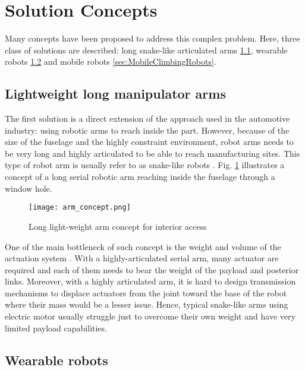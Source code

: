\section{Solution Concepts}

Many concepts have been proposed to address this complex problem. Here, three class of solutions are described: long snake-like articulated arms \ref{sec:LightWeightLongManipulatorArm}, wearable robots \ref{sec:WearableRobots} and mobile robots \ref{sec:MobileClimbingRobots}.

\subsection{Lightweight long manipulator arms}
\label{sec:LightWeightLongManipulatorArm}

The first solution is a direct extension of the approach used in the automotive industry: using robotic arms to reach inside the part. However, because of the size of the fuselage and the highly constraint environment, robot arms needs to be very long and highly articulated to be able to reach manufacturing sites. This type of robot arm is usually refer to as snake-like robots \cite{buckingham_snake-arm_2007}. Fig. \ref{fig:arm_concept} illustrates a concept of a long serial robotic arm reaching inside the fuselage through a window hole.

\begin{figure}[H]
	\centering
		\texttt{[image: arm\_concept.png]}
		\caption{Long light-weight arm concept for interior access}
	\label{fig:arm_concept}
\end{figure}

One of the main bottleneck of such concept is the weight and volume of the actuation system \cite{roy_nonlinear_2009}. With a highly-articulated serial arm, many actuator are required and each of them needs to bear the weight of the payload and posterior links. Moreover, with a highly articulated arm, it is hard to design transmission mechanisms to displace actuators from the joint toward the base of the robot where their mass would be a lesser issue. Hence, typical snake-like arms using electric motor usually struggle just to overcome their own weight and have very limited payload capabilities.


\subsection{Wearable robots}
\label{sec:WearableRobots}

